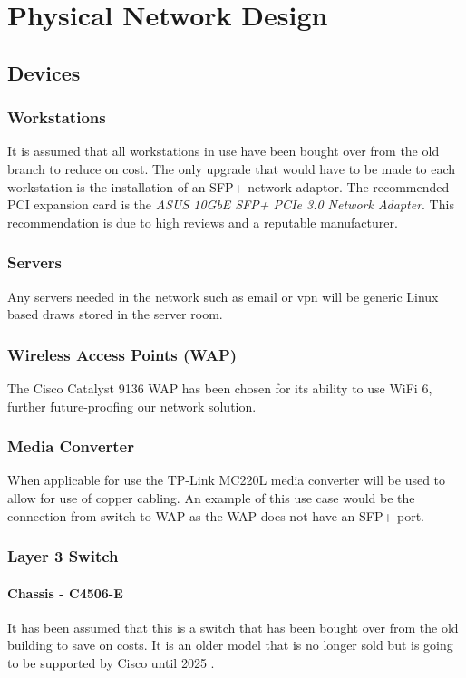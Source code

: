 \chapter{Physical Network Design}

\section{Devices}
\subsection{Workstations}
It is assumed that all workstations in use have been bought over from the old branch to reduce on cost. The only upgrade that would have to be made to each workstation is the installation of an SFP+ network adaptor. The recommended PCI expansion card is the \emph{ASUS 10GbE SFP+ PCIe 3.0 Network Adapter}. This recommendation is due to high reviews and a reputable manufacturer.
\subsection{Servers}
Any servers needed in the network such as email or vpn will be generic Linux based draws stored in the server room.
\subsection{Wireless Access Points (WAP)}
The Cisco Catalyst 9136 WAP has been chosen for its ability to use WiFi 6, further future-proofing our network solution.
\subsection{Media Converter}
When applicable for use the TP-Link MC220L media converter will be used to allow for use of copper cabling. An example of this use case would be the connection from switch to WAP as the WAP does not have an SFP+ port.
\subsection{Layer 3 Switch}
\subsubsection{Chassis - C4506-E}
It has been assumed that this is a switch that has been bought over from the old building to save on costs. It is an older model that is no longer sold but is going to be supported by Cisco until 2025 \parencite{cisco-4506}.
